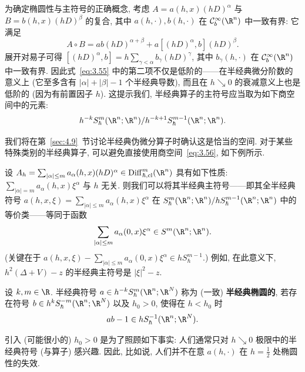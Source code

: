 为确定椭圆性与主符号的正确概念, 考虑 $A = a(h, x) (h D)^\alpha$ 与 $B = b(h, x) (h D)^\beta$ 的复合, 其中 $a(h, \cdot), b(h, \cdot)$ 在 $\mathcal{C}_b^\infty(\R^n)$ 中一致有界: 它满足
\begin{equation}\label{eq:3.55}
    A \circ B = a b (h D)^{\alpha + \beta} + a [(h D)^\alpha, b] (h D)^\beta.
\end{equation}
展开对易子可得 $[(h D)^\alpha, b] = h \sum_{\gamma < \alpha} b_\gamma (h D)^\gamma$, 其中 $b_\gamma(h, \cdot)$ 在 $\mathcal{C}_b^\infty(\R^n)$ 中一致有界. 因此式~\eqref{eq:3.55} 中的第二项不仅是低阶的——在半经典微分阶数的意义上 (它至多含有 $|\alpha| + |\beta| - 1$ 个半经典导数), 而且在 $h \searrow 0$ 的衰减意义上也是低阶的 (因为有前置因子 $h$). 这提示我们, 半经典算子的主符号应当取为如下商空间中的元素:
\begin{equation}\label{eq:3.56}
    h^{-k} S_\hbar^m(\R^n; \R^n) / h^{-k+1} S_\hbar^{m-1}(\R^n; \R^n).
\end{equation}

我们将在第~\ref{sec:4.9}~节讨论半经典伪微分算子时确认这是恰当的空间. 对于某些特殊类别的半经典算子, 可以避免直接使用商空间~\eqref{eq:3.56}, 如下例所示.

\begin{example}[特定微分算子的半经典主符号]\label{eg:3.20}
设 $A_h = \sum_{|\alpha| \le m} a_\alpha(h, x) (h D)^\alpha \in \Diff_{\hbar, \mathrm{cl}}^m(\R^n)$ 具有如下性质: $\sum_{|\alpha| = m} a_\alpha(h, x) \xi^\alpha$ 与 $h$ 无关. 则我们可以将其半经典主符号——即其全半经典符号 $a(h, x, \xi) = \sum_{|\alpha| \le m} a_\alpha(h, x) \xi^\alpha$ 在 $S_\hbar^m(\R^n; \R^n) / h S_\hbar^{m-1}(\R^n; \R^n)$ 中的等价类——等同于函数
\begin{equation}\label{eq:3.57}
    \sum_{|\alpha| \le m} a_\alpha(0, x) \xi^\alpha \in S^m(\R^n; \R^n).
\end{equation}
(关键在于 $a(h, x, \xi) - \sum_{|\alpha| \le m} a_\alpha(0, x) \xi^\alpha \in h S_\hbar^{m-1}$.) 例如, 在此意义下, $h^2(\Delta + V) - z$ 的半经典主符号是 $|\xi|^2 - z$.
\end{example}

\begin{definition}[半经典椭圆性]\label{def:3.21}
设 $k, m \in \R$. 半经典符号 $a \in h^{-k} S_\hbar^m(\R^n; \R^N)$ 称为 (一致) \textbf{半经典椭圆的}, 若存在符号 $b \in h^k S_\hbar^{-m}(\R^n; \R^N)$ 以及 $h_0 > 0$, 使得在 $h < h_0$ 时
\[
    a b - 1 \in h S_\hbar^{-1}(\R^n; \R^N).
\]
\end{definition}

引入 (可能很小的) $h_0 > 0$ 是为了照顾如下事实: 人们通常只对 $h \searrow 0$ 极限中的半经典符号 (与算子) 感兴趣. 因此, 比如说, 人们并不在意 $a(h, \cdot)$ 在 $h = \frac{1}{2}$ 处椭圆性的失效.

